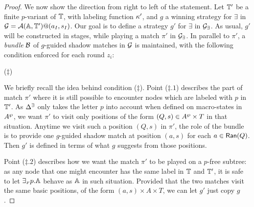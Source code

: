 \begin{proof}
We now show the direction from right to left of the statement. Let $\mathbb{T}'$ be a finite $p$-variant of
$\mathbb{T}$, with labeling function $\kappa'$, and $g$ a winning strategy for $\exists$ in $\mathcal{G} = \mathcal{A}(\mathbb{A},\mathbb{T}')@(a_I,s_I)$. Our goal is to define a strategy $g'$ for $\exists$ in $\mathcal{G_{\exists}}$. As usual, $g'$ will be constructed in stages, while playing a match $\pi'$ in $\mathcal{G_{\exists}}$. In parallel to $\pi'$, a \emph{bundle} $\mathcal{B}$ of $g$-guided shadow matches in $\mathcal{G}$ is maintained, with the following condition enforced for each round $z_i$:
\smallskip
\begin{center}
\hspace*{0.3cm}($\ddag$)
\end{center}
\smallskip
We briefly recall the idea behind condition ($\ddag$). Point ($\ddag.1$) describes the part of match $\pi'$ where it is still possible to encounter nodes which are labeled with $p$ in $\mathbb{T}'$. As $\Delta^\exists$ only takes the letter $p$ into account when defined on macro-states in $A^{\wp}$, we want $\pi'$ to visit only positions of the form $(Q,s) \in A^{\wp} \times T$ in that situation. Anytime we visit such a position $(Q,s)$ in $\pi'$, the role of the bundle is to provide one $g$-guided shadow match at position $(a,s)$ for each $a \in \mathsf{Ran}(Q)$.
Then $g'$ is defined in terms of what $g$ suggests from those positions.

 Point ($\ddag.2$) describes how we want the match $\pi'$ to be
 played on a $p$-free subtree: as any node that one might encounter has the same label in $\mathbb{T}$ and $\mathbb{T}'$,
it is safe to let ${\exists_{{\scriptscriptstyle F}} p}.\mathbb{A}$ behave as $\mathbb{A}$ in such situation. Provided that the two matches visit the same basic positions, of the form $(a,s)\times A \times T$, we can let $g'$ just copy $g$.


\end{proof}
